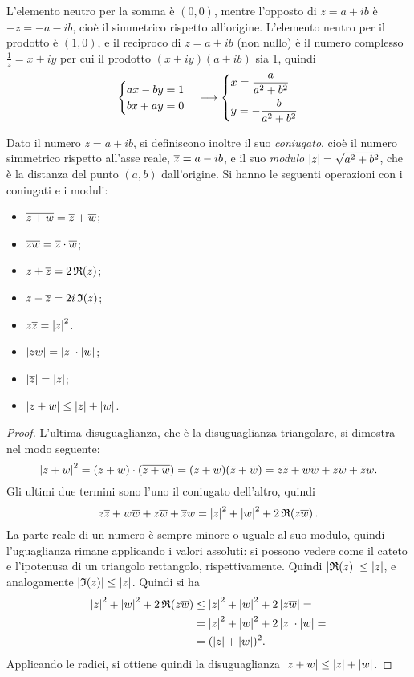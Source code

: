 L'elemento neutro per la somma è $(0,0)$, mentre l'opposto di $z=a+ib$ è $-z=-a-ib$, cioè il simmetrico rispetto all'origine.
L'elemento neutro per il prodotto è $(1,0)$, e il reciproco di $z=a+ib$ (non nullo) è il numero complesso $\frac1{z}=x+iy$ per cui il prodotto $(x+iy)(a+ib)$ sia 1, quindi
\[
\begin{cases}
	ax-by=1\\
	bx+ay=0
\end{cases}
\longrightarrow
\begin{dcases}
	x=\frac{a}{a^2+b^2}\\
	y=-\frac{b}{a^2+b^2}
\end{dcases}
\]

Dato il numero $z=a+ib$, si definiscono inoltre il suo \emph{coniugato}, cioè il numero simmetrico rispetto all'asse reale, $\overline{z}=a-ib$, e il suo \emph{modulo} $\left|{z}\right|=\sqrt{a^2+b^2}$, che è la  distanza del punto $(a,b)$ dall'origine.
Si hanno le seguenti operazioni con i coniugati e i moduli:
\begin{itemize}
\item $\overline{z+w}=\overline{z}+\overline{w}$;
\item $\overline{zw}=\overline{z}\cdot\overline{w}$;
\item $z+\overline{z}=2\,\mathfrak{R}\!\left({z}\right)$;
\item $z-\overline{z}= 2i\,\mathfrak{I}\!\left({z}\right)$;
\item $z\overline{z}=\left|{z}\right|^2$.
\item $\left|{zw}\right|=\left|{z}\right|\cdot\left|{w}\right|$;
\item $\left|{\overline{z}}\right|=\left|{z}\right|$;
\item $\left|{z+w}\right|\leq\left|{z}\right|+\left|{w}\right|$.
\end{itemize}
\begin{proof}
L'ultima disuguaglianza, che è la disuguaglianza triangolare, si dimostra nel modo seguente:
\[
\left|{z+w}\right|^2=(z+w)\cdot(\overline{z+w})=(z+w)(\overline{z}+\overline{w})=z\overline{z}+w\overline{w}+z\overline{w}+\overline{z}w.
\]
Gli ultimi due termini sono l'uno il coniugato dell'altro, quindi
\[
z\overline{z}+w\overline{w}+z\overline{w}+\overline{z}w=\left|{z}\right|^2+\left|{w}\right|^2+2\,\mathfrak{R}\!\left({z\overline{w}}\right).
\]
La parte reale di un numero è sempre minore o uguale al suo modulo, quindi l'uguaglianza rimane applicando i valori assoluti: si possono vedere come il cateto e l'ipotenusa di un triangolo rettangolo, rispettivamente. Quindi $\left|{\mathfrak{R}\!\left({z}\right)}\right|\leq\left|{z}\right|$, e analogamente $\left|{\mathfrak{I}\!\left({z}\right)}\right|\leq\left|{z}\right|$. Quindi si ha
\[
\begin{split}
\left|{z}\right|^2+\left|{w}\right|^2+2\,\mathfrak{R}\!\left({z\overline{w}}\right)&\leq\left|{z}\right|^2+\left|{w}\right|^2+2\left|{z\overline{w}}\right|=\\
&=\left|{z}\right|^2+\left|{w}\right|^2+2\left|{z}\right|\cdot\left|{w}\right|=\\
&=(\left|{z}\right|+\left|{w}\right|)^2.
\end{split}
\]
Applicando le radici, si ottiene quindi la disuguaglianza $\left|{z+w}\right|\leq\left|{z}\right|+\left|{w}\right|$.
\end{proof}
